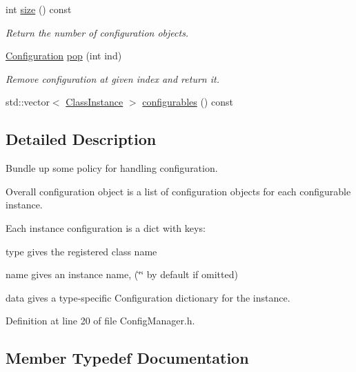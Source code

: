 \begin{DoxyCompactItemize}
\item 
int \hyperlink{class_wire_cell_1_1_config_manager_ad47aaaeff27496deac1eb2eae1bd01c8}{size} () const
\begin{DoxyCompactList}\small\item\em Return the number of configuration objects. \end{DoxyCompactList}\item 
\hyperlink{namespace_wire_cell_a9f705541fc1d46c608b3d32c182333ee}{Configuration} \hyperlink{class_wire_cell_1_1_config_manager_a4168a64d0957e95cf64565ef8f74fbf8}{pop} (int ind)
\begin{DoxyCompactList}\small\item\em Remove configuration at given index and return it. \end{DoxyCompactList}\item 
std\+::vector$<$ \hyperlink{class_wire_cell_1_1_config_manager_adffbbcadcf6c79655c6809b9155184cb}{Class\+Instance} $>$ \hyperlink{class_wire_cell_1_1_config_manager_a7981627a4327f308bc3008337c39db07}{configurables} () const
\end{DoxyCompactItemize}


\subsection{Detailed Description}
Bundle up some policy for handling configuration.

Overall configuration object is a list of configuration objects for each configurable instance.

Each instance configuration is a dict with keys\+:


\begin{DoxyItemize}
\item type gives the registered class name
\item name gives an instance name, (\char`\"{}\char`\"{} by default if omitted)
\item data gives a type-\/specific Configuration dictionary for the instance. 
\end{DoxyItemize}

Definition at line 20 of file Config\+Manager.\+h.



\subsection{Member Typedef Documentation}
\mbox{\label{class_wire_cell_1_1_config_manager_adffbbcadcf6c79655c6809b9155184cb}} 
